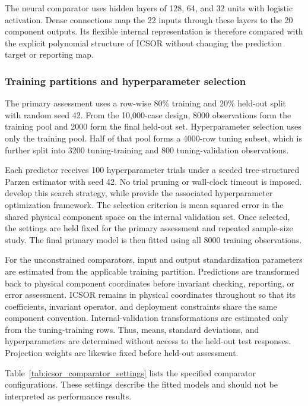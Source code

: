 The neural comparator uses hidden layers of 128, 64, and 32 units with logistic activation. Dense connections map the 22 inputs through these layers to the 20 component outputs. Its flexible internal representation is therefore compared with the explicit polynomial structure of ICSOR without changing the prediction target or reporting map.

\subsubsection{Training partitions and hyperparameter selection}

The primary assessment uses a row-wise 80\% training and 20\% held-out split with random seed 42. From the 10,000-case design, 8000 observations form the training pool and 2000 form the final held-out set. Hyperparameter selection uses only the training pool. Half of that pool forms a 4000-row tuning subset, which is further split into 3200 tuning-training and 800 tuning-validation observations.

Each predictor receives 100 hyperparameter trials under a seeded tree-structured Parzen estimator with seed 42. No trial pruning or wall-clock timeout is imposed. \citet{Bergstra2011} develop this search strategy, while \citet{Akiba2019} provide the associated hyperparameter optimization framework. The selection criterion is mean squared error in the shared physical component space on the internal validation set. Once selected, the settings are held fixed for the primary assessment and repeated sample-size study. The final primary model is then fitted using all 8000 training observations.

For the unconstrained comparators, input and output standardization parameters are estimated from the applicable training partition. Predictions are transformed back to physical component coordinates before invariant checking, reporting, or error assessment. ICSOR remains in physical coordinates throughout so that its coefficients, invariant operator, and deployment constraints share the same component convention. Internal-validation transformations are estimated only from the tuning-training rows. Thus, means, standard deviations, and hyperparameters are determined without access to the held-out test responses. Projection weights are likewise fixed before held-out assessment.

Table~\ref{tab:icsor_comparator_settings} lists the specified comparator configurations. These settings describe the fitted models and should not be interpreted as performance results.

